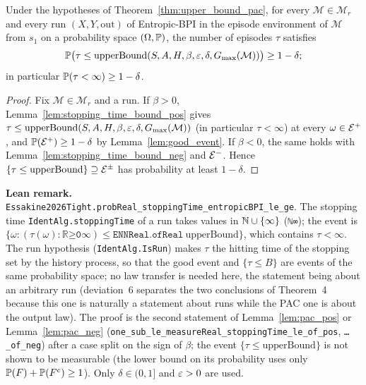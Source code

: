 \begin{theorem}\label{thm:upper_bound_complexity}
\leanok
{}
Under the hypotheses of Theorem~\ref{thm:upper_bound_pac}, for every $\mathcal M \in \mathcal M_r$
and every run $(X, Y, \mathrm{out})$ of Entropic-BPI in the episode environment of $\mathcal M$
from $s_1$ on a probability space $(\Omega, \mathbb{P})$, the number of episodes $\tau$ satisfies
\[
  \mathbb{P}\big(\tau \le \mathrm{upperBound}(S, A, H, \beta, \varepsilon, \delta, G_{\max}(\mathcal M))\big) \ge 1 - \delta ;
\]
in particular $\mathbb{P}(\tau < \infty) \ge 1 - \delta$.
\end{theorem}

\begin{proof}
\leanok
Fix $\mathcal M \in \mathcal M_r$ and a run. If $\beta > 0$, Lemma~\ref{lem:stopping_time_bound_pos}
gives $\tau \le \mathrm{upperBound}(S,A,H,\beta,\varepsilon,\delta,G_{\max}(\mathcal M))$ (in particular
$\tau < \infty$) at every $\omega \in \mathcal{E}^+$, and $\mathbb{P}(\mathcal{E}^+) \ge 1 - \delta$ by
Lemma~\ref{lem:good_event}. If $\beta < 0$, the same holds with
Lemma~\ref{lem:stopping_time_bound_neg} and $\mathcal{E}^-$. Hence
$\{\tau \le \mathrm{upperBound}\} \supseteq \mathcal{E}^\pm$ has probability at least $1 - \delta$.
\end{proof}

\textbf{Lean remark.} \texttt{Essakine2026Tight.probReal\_stoppingTime\_entropicBPI\_le\_ge}.
The stopping time \texttt{IdentAlg.stoppingTime} of a run takes values in $\mathbb{N} \cup \{\infty\}$
(\texttt{ℕ∞}); the event is $\{\omega : (\tau(\omega) : \texttt{ℝ≥0∞}) \le \texttt{ENNReal.ofReal}\ \mathrm{upperBound}\}$,
which contains $\tau < \infty$. The run hypothesis (\texttt{IdentAlg.IsRun}) makes
$\tau$ the hitting time of the stopping set by the history process, so that the good event and
$\{\tau \le B\}$ are events of the same probability space; no law transfer is needed here, the
statement being about an arbitrary run (deviation~6 separates the two conclusions of Theorem~4
because this one is naturally a statement about runs while the PAC one is about the output law).
The proof is the second statement of Lemma~\ref{lem:pac_pos} or Lemma~\ref{lem:pac_neg}
(\texttt{one\_sub\_le\_measureReal\_stoppingTime\_le\_of\_pos}, \texttt{…\_of\_neg}) after a case split on the sign
of $\beta$; the event $\{\tau \le \mathrm{upperBound}\}$ is not shown to be measurable (the lower bound on its
probability uses only $\mathbb{P}(F) + \mathbb{P}(F^c) \ge 1$). Only $\delta \in (0, 1]$ and $\varepsilon > 0$ are used.

